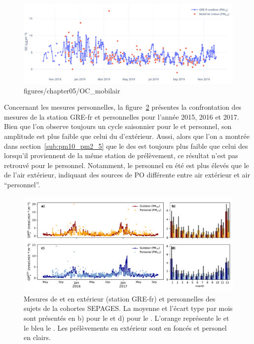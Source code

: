 \begin{figure}[ht]
    \centering
    \includegraphics[width=1.\linewidth]{figures/chapter05/OC_mobilair.png}
    \caption{figures/chapter05/OC_mobilair}%
    \label{fig:figures/chapter05/OC_mobilair}
\end{figure}

Concernant les mesures personnelles, la figure~\ref{fig:figures/chapter05/personnal_OP}
présentes la confrontation des mesures de la station GRE-fr et personnelles pour l'année
2015, 2016 et 2017. Bien que l'on observe toujours un cycle saisonnier pour le \POAAv{} et
\PODTTv{} personnel, son amplitude est plus faible que celui du \POv{} d'extérieur. Aussi,
alors que l'on a montrée dans section~\ref{sub:pm10_pm2_5} que le \POv{} des \PMdc{} est
toujours plus faible que celui des \PMdix{} lorsqu'il proviennent de la même station de
prélèvement, ce résultat n'est pas retrouvé pour le \POv{} personnel. Notamment, le \POv{}
personnel en été est plus élevés que le \POv{} de l'air extérieur, indiquant des sources
de PO différente entre air extérieur et air ``personnel''.

\begin{figure}[ht]
    \centering
    \includegraphics[width=1.0\linewidth]{figures/chapter05/personnal_OP.pdf}
    \caption{Mesures de \POAAv{} et \PODTTv{} en extérieur (station GRE-fr) et
    personnelles des sujets de la cohortes SEPAGES. La moyenne et l'écart type par mois
sont présentés en b) pour le \POAAv{} et d) pour le \PODTTv. L'orange représente le
\POAAv{} et le bleu le \PODTTv{}. Les prélèvements en extérieur sont en foncés et personel
en clairs.}%
    \label{fig:figures/chapter05/personnal_OP}
\end{figure}


